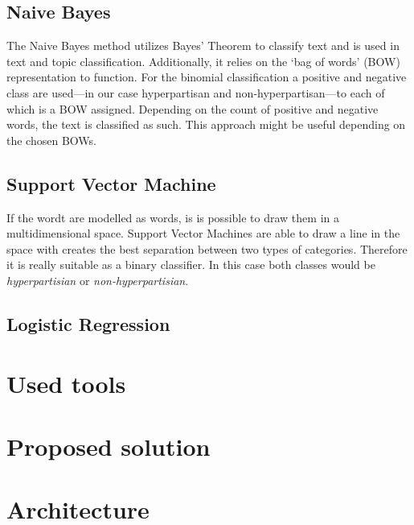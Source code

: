 \documentclass{article}
\begin{document}
\subsection{Naive Bayes}
The Naive Bayes method utilizes Bayes' Theorem to classify text and is used in text and topic classification.
Additionally, it relies on the `bag of words' (BOW) representation to function.
For the binomial classification a positive and negative class are used---in our case hyperpartisan and non-hyperpartisan---to each of which is a BOW assigned.
Depending on the count of positive and negative words, the text is classified as such.
This approach might be useful depending on the chosen BOWs.
\subsection{Support Vector Machine}

If the wordt are modelled as words, is is possible to draw them in a multidimensional space. Support Vector Machines are able to draw a line in the space with creates the best separation between two types of categories. Therefore it is really suitable as a binary classifier. In this case both classes would be \textit{hyperpartisian} or \textit{non-hyperpartisian}.

\subsection{Logistic Regression}

\section{Used tools}

\section{Proposed solution}

\section{Architecture}
\end{document}
